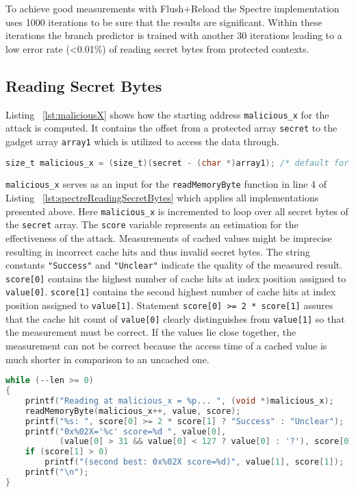 \documentclass[a4paper,oneside,openright] {scrreprt}
\begin{document}
To achieve good measurements with Flush+Reload the Spectre implementation uses 1000 iterations to be sure that the results
are significant. Within these iterations the branch predictor is trained with another 30 iterations leading to a low error rate (<0.01\%)
of reading secret bytes from protected contexts.

\subsection{Reading Secret Bytes}
\label{ch:intro:motivation:A}

Listing ~\ref{lst:maliciousX} shows how the starting address \texttt{malicious\_x} for the attack is computed.
It contains the offset from a protected array \texttt{secret} to the gadget array \texttt{array1} 
which is utilized to access the data through.

\begin{lstlisting}[language=C, caption=Spectre: Malicious X, label={lst:maliciousX}]
size_t malicious_x = (size_t)(secret - (char *)array1); /* default for malicious_x */
\end{lstlisting}

\texttt{malicious\_x} serves as an input for the \texttt{readMemoryByte} function in line 4 of Listing ~\ref{lst:spectreReadingSecretBytes} 
which applies all implementations presented above.
Here \texttt{malicious\_x} is incremented to loop over all secret bytes of the \texttt{secret} array.
The \texttt{score} variable represents an estimation for the effectiveness of the attack.
Measurements of cached values might be imprecise resulting in incorrect cache hits and thus invalid secret bytes.
The string constants \texttt{"Success"} and \texttt{"Unclear"} indicate the quality of the measured result.
\texttt{score[0]} contains the highest number of cache hits at index position assigned to \texttt{value[0]}.
\texttt{score[1]} contains the second highest number of cache hits at index position assigned to \texttt{value[1]}.
Statement \texttt{score[0] >= 2 * score[1]} assures that the cache hit count of \texttt{value[0]} clearly distinguishes from 
\texttt{value[1]} so that the measurement must be correct. If the values lie close together, the measurement can not be correct 
because the access time of a cached value is much shorter in comparison to an uncached one. 

\begin{lstlisting}[language=C, caption=Spectre: Reading Secret Bytes, label={lst:spectreReadingSecretBytes}]
while (--len >= 0)
{
    printf("Reading at malicious_x = %p... ", (void *)malicious_x);
    readMemoryByte(malicious_x++, value, score);
    printf("%s: ", score[0] >= 2 * score[1] ? "Success" : "Unclear");
    printf("0x%02X='%c' score=%d ", value[0],
           (value[0] > 31 && value[0] < 127 ? value[0] : '?'), score[0]);
    if (score[1] > 0)
        printf("(second best: 0x%02X score=%d)", value[1], score[1]);
    printf("\n");
}
\end{lstlisting}
\end{document}
